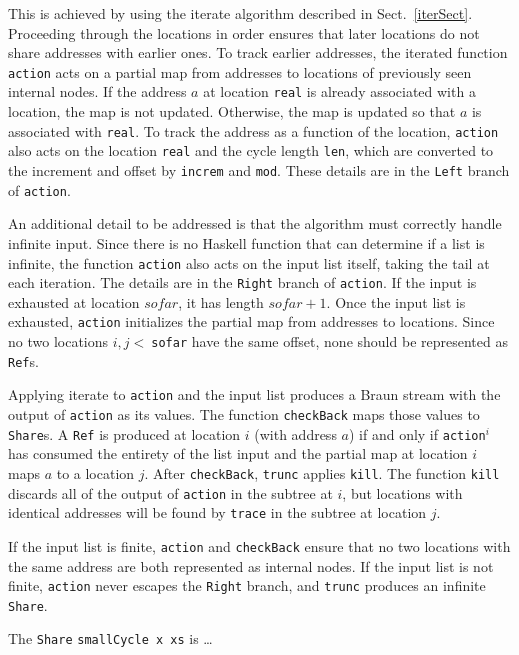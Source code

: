 \documentclass[envcountsect]{llncs}
\newcommand{\share}{{\tt Share} }
\begin{document}
This is achieved by using the iterate algorithm described in Sect.~\ref{iterSect}.
Proceeding through the locations in order ensures that later locations do not share addresses with earlier ones.
To track earlier addresses, the iterated function {\tt action} acts on a partial map from addresses to locations of previously seen internal nodes.
If the address $a$ at location {\tt real} is already associated with a location, the map is not updated.
Otherwise, the map is updated so that $a$ is associated with {\tt real}.
To track the address as a function of the location, {\tt action} also acts on the location {\tt real} and the cycle length {\tt len}, which are converted to the increment and offset by {\tt increm} and {\tt mod}.
These details are in the {\tt Left} branch of {\tt action}.

An additional detail to be addressed is that the algorithm must correctly handle infinite input.
Since there is no Haskell function that can determine if a list is infinite, the function {\tt action} also acts on the input list itself, taking the tail at each iteration.
The details are in the {\tt Right} branch of {\tt action}.
If the input is exhausted at location $sofar$, it has length $sofar+1$.
Once the input list is exhausted, {\tt action} initializes the partial map from addresses to locations.
Since no two locations $i,j <\ ${\tt sofar} have the same offset, none should be represented as {\tt Ref}s.

Applying iterate to {\tt action} and the input list produces a Braun stream with the output of {\tt action} as its values.
The function {\tt checkBack} maps those values to {\tt Share}s.
A {\tt Ref} is produced at location $i$ (with address $a$) if and only if {\tt action}$^i$ has consumed the entirety of the list input and the partial map at location $i$ maps $a$ to a location $j$. %
After {\tt checkBack}, {\tt trunc} applies {\tt kill}.
The function {\tt kill} discards all of the output of {\tt action} in the subtree at $i$, but locations with identical addresses will be found by {\tt trace} in the subtree at location $j$.

If the input list is finite, {\tt action} and {\tt checkBack} ensure that no two locations with the same address are both represented as internal nodes.
If the input list is not finite, {\tt action} never escapes the {\tt Right} branch, and {\tt trunc} produces an infinite {\tt Share}.

The \share {\tt smallCycle x xs} is \ldots
\end{document}
